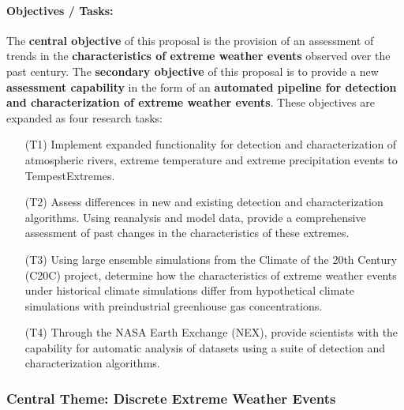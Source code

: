 \documentclass[11pt]{article}
\begin{document}
\paragraph{Objectives / Tasks:}  The \textbf{central objective} of this proposal {\color{blue}is} the provision of an assessment of trends in the \textbf{characteristics of extreme weather events} observed over the past century.  The \textbf{secondary objective} of this proposal is to provide a new \textbf{assessment capability} in the form of an \textbf{automated pipeline for detection and characterization of extreme weather events}.  These objectives are expanded as four research tasks: 
\begin{itemize}
\item[(T1)] Implement expanded functionality for detection and characterization of atmospheric rivers, extreme temperature and extreme precipitation events to TempestExtremes.

\item[(T2)] Assess differences in new and existing detection and characterization algorithms.  Using reanalysis and model data, provide a comprehensive assessment of past changes in the characteristics of these extremes.

\item[(T3)] Using large ensemble simulations from the Climate of the 20th Century (C20C) project, determine how the characteristics of extreme weather events under historical climate simulations differ from hypothetical climate simulations with preindustrial greenhouse gas concentrations.


\item[(T4)] Through the NASA Earth Exchange (NEX), provide scientists with the capability for automatic analysis of datasets using a suite of detection and characterization algorithms. 
\end{itemize}


\subsubsection{Central Theme: Discrete Extreme Weather Events}
\end{document}

